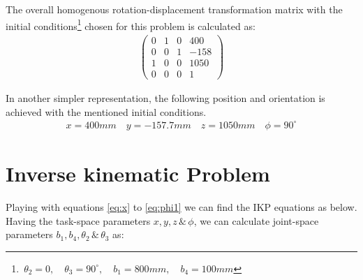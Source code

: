 \documentclass[conference]{IEEEtran}
\begin{document}
The overall homogenous rotation-displacement transformation matrix with the initial conditions\footnote{$\, \theta_2=0, \quad \theta_3=90^\circ, \quad b_1=800mm, \quad b_4=100mm$} chosen for this problem is calculated as:
\begin{align*}
    \left(\begin{array}{cccc} 0 & 1 & 0 & 400\\ 0 & 0 & 1 & -158\\ 1 & 0 & 0 & 1050\\ 0 & 0 & 0 & 1 \end{array}\right)
\end{align*}

In another simpler representation, the following position and orientation is achieved with the mentioned initial conditions.
\begin{align*}
    x = 400 mm \quad y = -157.7 mm \quad z = 1050 mm \quad \phi = 90^\circ
\end{align*}
\vspace{10px}

\section{Inverse kinematic Problem}
Playing with equations \ref{eq:x} to \ref{eq:phi1} we can find the IKP equations as below. Having the task-space parameters $x, y, z \, \& \, \phi$, we can calculate joint-space parameters $b_1, b_4, \theta_2 \, \& \, \theta_3$ as:
\end{document}
